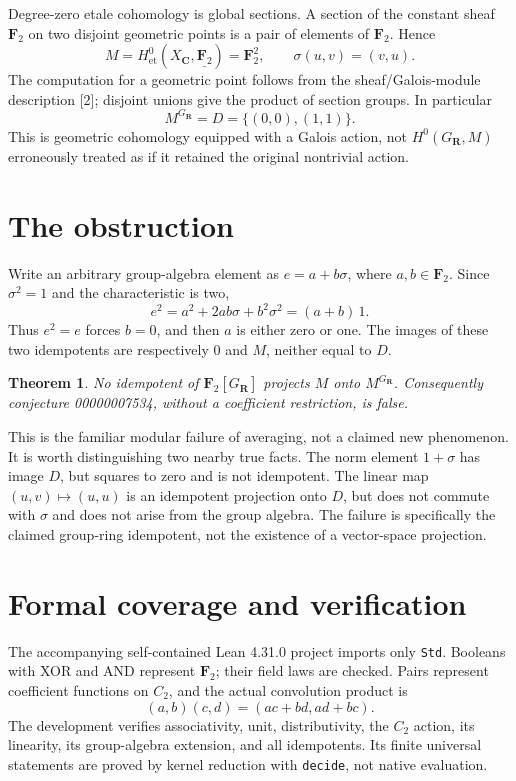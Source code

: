 \documentclass[10pt]{article}
\newtheorem{theorem}{Theorem}
\newcommand{\F}{\mathbf F_2}
\begin{document}
Degree-zero etale cohomology is global sections. A section of the constant sheaf $\F$ on two disjoint geometric points is a pair of elements of $\F$. Hence
\[
M=H^0_{\mathrm{et}}(X_{\mathbf C},\underline{\F})=\F^2,
\qquad \sigma(u,v)=(v,u).
\]
The computation for a geometric point follows from the sheaf/Galois-module description [2]; disjoint unions give the product of section groups. In particular
\[
M^{G_{\mathbf R}}=D=\{(0,0),(1,1)\}.
\]
This is geometric cohomology equipped with a Galois action, not $H^0(G_{\mathbf R},M)$ erroneously treated as if it retained the original nontrivial action.
\section{The obstruction}
Write an arbitrary group-algebra element as $e=a+b\sigma$, where $a,b\in\F$. Since $\sigma^2=1$ and the characteristic is two,
\[
e^2=a^2+2ab\sigma+b^2\sigma^2=(a+b)\,1.
\]
Thus $e^2=e$ forces $b=0$, and then $a$ is either zero or one. The images of these two idempotents are respectively $0$ and $M$, neither equal to $D$.
\begin{theorem}
No idempotent of $\F[G_{\mathbf R}]$ projects $M$ onto $M^{G_{\mathbf R}}$. Consequently conjecture 00000007534, without a coefficient restriction, is false.
\end{theorem}
This is the familiar modular failure of averaging, not a claimed new phenomenon. It is worth distinguishing two nearby true facts. The norm element $1+\sigma$ has image $D$, but squares to zero and is not idempotent. The linear map $(u,v)\mapsto(u,u)$ is an idempotent projection onto $D$, but does not commute with $\sigma$ and does not arise from the group algebra. The failure is specifically the claimed group-ring idempotent, not the existence of a vector-space projection.
\section{Formal coverage and verification}
The accompanying self-contained Lean 4.31.0 project imports only \texttt{Std}. Booleans with XOR and AND represent $\F$; their field laws are checked. Pairs represent coefficient functions on $C_2$, and the actual convolution product is
\[
(a,b)(c,d)=(ac+bd,ad+bc).
\]
The development verifies associativity, unit, distributivity, the $C_2$ action, its linearity, its group-algebra extension, and all idempotents. Its finite universal statements are proved by kernel reduction with \texttt{decide}, not native evaluation.
\end{document}
